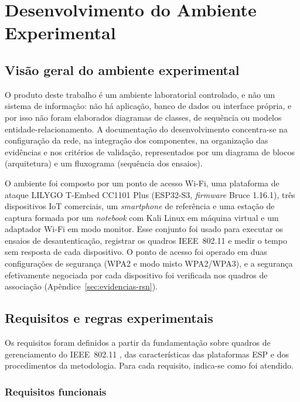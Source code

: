 \chapter{Desenvolvimento do Ambiente Experimental}
\label{cap:desenvolvimento}

\section{Visão geral do ambiente experimental}
\label{sec:visao_geral_ambiente}
\label{subsec:adequacao_tipo_projeto}

O produto deste trabalho é um ambiente laboratorial controlado, e não um sistema de informação: não há aplicação, banco de dados ou interface própria, e por isso não foram elaborados diagramas de classes, de sequência ou modelos entidade-relacionamento. A documentação do desenvolvimento concentra-se na configuração da rede, na integração dos componentes, na organização das evidências e nos critérios de validação, representados por um diagrama de blocos (arquitetura) e um fluxograma (sequência dos ensaios).

O ambiente foi composto por um ponto de acesso Wi-Fi, uma plataforma de ataque LILYGO T-Embed CC1101 Plus (ESP32-S3, \textit{firmware} Bruce 1.16.1), três dispositivos IoT comerciais, um \textit{smartphone} de referência e uma estação de captura formada por um \textit{notebook} com Kali Linux em máquina virtual e um adaptador Wi-Fi em modo monitor. Esse conjunto foi usado para executar os ensaios de desautenticação, registrar os quadros IEEE~802.11 e medir o tempo sem resposta de cada dispositivo. O ponto de acesso foi operado em duas configurações de segurança (WPA2 e modo misto WPA2/WPA3), e a segurança efetivamente negociada por cada dispositivo foi verificada nos quadros de associação (Apêndice~\ref{sec:evidencias-rsn}).

\section{Requisitos e regras experimentais}
\label{sec:requisitos_experimento}

Os requisitos foram definidos a partir da fundamentação sobre quadros de gerenciamento do IEEE~802.11 \cite{KohliosHayajneh2018,Amoordon2022}, das características das plataformas ESP \cite{LitayemAlsadi2023} e dos procedimentos da metodologia. Para cada requisito, indica-se como foi atendido.

\subsection{Requisitos funcionais}
\label{subsec:requisitos_funcionais}

